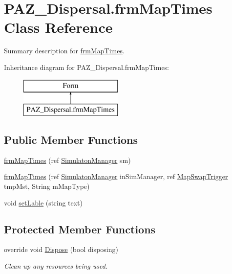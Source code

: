 \hypertarget{class_p_a_z___dispersal_1_1frm_map_times}{\section{P\-A\-Z\-\_\-\-Dispersal.\-frm\-Map\-Times Class Reference}
\label{class_p_a_z___dispersal_1_1frm_map_times}
}


Summary description for \hyperlink{class_p_a_z___dispersal_1_1frm_map_times}{frm\-Map\-Times}.  


Inheritance diagram for P\-A\-Z\-\_\-\-Dispersal.\-frm\-Map\-Times\-:\begin{figure}[H]
\begin{center}
\leavevmode
\includegraphics[height=2.000000cm]{class_p_a_z___dispersal_1_1frm_map_times}
\end{center}
\end{figure}
\subsection*{Public Member Functions}
\begin{DoxyCompactItemize}
\item 
\hyperlink{class_p_a_z___dispersal_1_1frm_map_times_a5d9fd60a5fca40d501e78749222aadde}{frm\-Map\-Times} (ref \hyperlink{class_p_a_z___dispersal_1_1_simulaton_manager}{Simulaton\-Manager} sm)
\item 
\hyperlink{class_p_a_z___dispersal_1_1frm_map_times_a0d4298d5abaf3d96bca0de2cf6fed131}{frm\-Map\-Times} (ref \hyperlink{class_p_a_z___dispersal_1_1_simulaton_manager}{Simulaton\-Manager} in\-Sim\-Manager, ref \hyperlink{class_p_a_z___dispersal_1_1_map_swap_trigger}{Map\-Swap\-Trigger} tmp\-Mst, String m\-Map\-Type)
\item 
void \hyperlink{class_p_a_z___dispersal_1_1frm_map_times_a9f2337e3730af8cac7e1179cadcf3b7d}{set\-Lable} (string text)
\end{DoxyCompactItemize}
\subsection*{Protected Member Functions}
\begin{DoxyCompactItemize}
\item 
override void \hyperlink{class_p_a_z___dispersal_1_1frm_map_times_a67f0880f28fd56baafb8a743ea13f468}{Dispose} (bool disposing)
\begin{DoxyCompactList}\small\item\em Clean up any resources being used. \end{DoxyCompactList}\end{DoxyCompactItemize}
